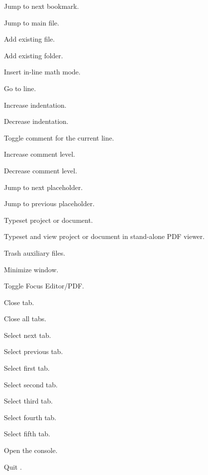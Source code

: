 \begin{description}
	\item[] Jump to next bookmark.
	\item[] Jump to main file.
	\item[] Add existing file.
	\item[] Add existing folder.
	\item[] Insert in-line math mode.
	\item[] Go to line.
	\item[\keys{\cmdkey + [}] Increase indentation.
	\item[\keys{\cmdkey + ]}] Decrease indentation.
	\item[\keys{\cmdkey + /}] Toggle comment for the current line.
	\item[\keys{\optkey + \cmdkey + /}] Increase comment level.
	\item[\keys{\ctlkey + \cmdkey + /}] Decrease comment level.
	\item[\keys{\cmdkey + \returnkey}] Jump to next placeholder.
	\item[\keys{\shiftkey + \cmdkey + \returnkey}] Jump to previous placeholder.
	\item[] Typeset project or document.
	\item[] Typeset and view project or document in stand-alone PDF viewer.
	\item[] Trash auxiliary files.
	\item[] Minimize window.
	\item[\keys{\optkey + \cmdkey + \tabkey}] Toggle Focus Editor/PDF{.}
	\item[] Close tab.
	\item[] Close all tabs.
	\item[\keys{\cmdkey + \}}] Select next tab.
	\item[\keys{\cmdkey + \{}] Select previous tab.
	\item[] Select first tab.
	\item[] Select second tab.
	\item[] Select third tab.
	\item[] Select fourth tab.
	\item[] Select fifth tab.
	\item[] Open the console.
	\item[] Quit \texnicle.\end{description}
